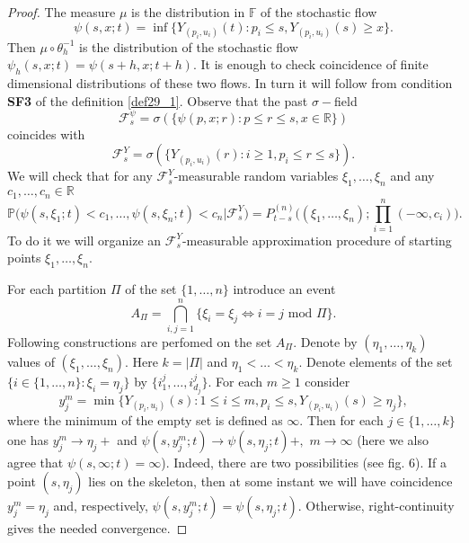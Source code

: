 \documentclass[a4paper,12pt]{article}
\newcommand{\1}{1\!\!\,{\rm I}}
\theoremstyle{plain}
\begin{document}
\begin{proof} The measure $\mu$ is the distribution in $\mathbb{F}$ of the stochastic flow 
	$$
	\psi(s,x;t)=\inf\{Y_{(p_i,u_i)}(t):p_i\leq s, Y_{(p_i,u_i)}(s)\geq x\}.
	$$
	Then $\mu\circ \theta^{-1}_h$ is the distribution of the stochastic flow $\psi_h(s,x;t)=\psi(s+h,x;t+h).$ 	It is enough to check coincidence of finite dimensional distributions of these two flows. In turn it will follow from condition {\bf SF3} of the definition \ref{def29_1}. Observe that the past $\sigma-$field 
	$$
	\mathcal{F}^\psi_s=\sigma(\{\psi(p,x;r):p\leq r\leq s, x\in\mathbb{R}\})
	$$
	coincides with 
	$$
	\mathcal{F}^Y_s=\sigma(\{Y_{(p_i,u_i)}(r):i\geq 1, p_i\leq r\leq s\}).
	$$
	We will check that for any $\mathcal{F}^Y_s$-measurable random variables $\xi_1,\ldots,\xi_n$ and any $c_1,\ldots,c_n\in \mathbb{R}$
	$$
	\mathbb{P}\Big(\psi(s,\xi_1;t)<c_1,\ldots,\psi(s,\xi_n;t)<c_n|\mathcal{F}^Y_s\Big)=P^{(n)}_{t-s}\bigg((\xi_1,\ldots,\xi_n);\prod^n_{i=1}(-\infty,c_i)\bigg).
	$$
	To do it we will organize an $\mathcal{F}^Y_s$-measurable approximation procedure of starting points $\xi_1,\ldots,\xi_n.$
	
	For each partition $\Pi$ of the set $\{1,\ldots,n\}$ introduce an event $$
	A_{\Pi}=\bigcap^n_{i,j=1}\{\xi_i=\xi_j\Leftrightarrow i=j \mbox{ mod }\Pi\}.
	$$
	Following constructions are perfomed on the set $A_{\Pi}.$ Denote by $(\eta_1,\ldots,\eta_k)$ values of $(\xi_1,\ldots,\xi_n).$  Here $k=|\Pi|$ and $\eta_1<\ldots<\eta_k.$ Denote elements of the set $\{i\in\{1,\ldots,n\}:\xi_i=\eta_j\}$ by $\{i^j_1,\ldots,i^j_{d_j}\}.$  For each $m\geq 1$ consider 
	$$
	y^m_{j}=\min\{Y_{(p_i,u_i)}(s):1\leq i\leq m, p_i\leq s, Y_{(p_i,u_i)}(s)\geq \eta_j\},
	$$
	where the minimum of the empty set is defined as $\infty.$ Then for each $j\in \{1,\ldots,k\}$ one has $y^m_j\to \eta_j+$ and $\psi(s,y^m_j;t)\to \psi(s,\eta_j;t)+,$ $m\to\infty$ (here we also agree that $\psi(s,\infty;t)=\infty$). Indeed, there are two possibilities (see fig. 6). If a point $(s,\eta_j)$ lies on the skeleton, then at some instant we will have coincidence $y^m_j=\eta_j$ and, respectively, $\psi(s,y^m_j;t)=\psi(s,\eta_j;t).$ Otherwise, right-continuity gives the needed convergence.
	

\end{proof}
\end{document}
